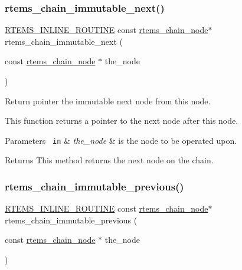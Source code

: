 \subsubsection{\texorpdfstring{rtems\_chain\_immutable\_next()}{rtems\_chain\_immutable\_next()}}
{\footnotesize\ttfamily \mbox{\hyperlink{group__RTEMSScoreBaseDefs_gac216239df231d5dbd15e3520b0b9313f}{R\+T\+E\+M\+S\+\_\+\+I\+N\+L\+I\+N\+E\+\_\+\+R\+O\+U\+T\+I\+NE}} const \mbox{\hyperlink{structChain__Node__struct}{rtems\+\_\+chain\+\_\+node}}$\ast$ rtems\+\_\+chain\+\_\+immutable\+\_\+next (\begin{DoxyParamCaption}\item[{const \mbox{\hyperlink{structChain__Node__struct}{rtems\+\_\+chain\+\_\+node}} $\ast$}]{the\+\_\+node }\end{DoxyParamCaption})}



Return pointer the immutable next node from this node. 

This function returns a pointer to the next node after this node.


\begin{DoxyParams}[1]{Parameters}
\mbox{\texttt{ in}}  & {\em the\+\_\+node} & is the node to be operated upon.\\
\hline
\end{DoxyParams}
\begin{DoxyReturn}{Returns}
This method returns the next node on the chain. 
\end{DoxyReturn}
\mbox{\label{group__ClassicChains_ga75c2d9901c833e2cf819065fd9a897cd}} 
\subsubsection{\texorpdfstring{rtems\_chain\_immutable\_previous()}{rtems\_chain\_immutable\_previous()}}
{\footnotesize\ttfamily \mbox{\hyperlink{group__RTEMSScoreBaseDefs_gac216239df231d5dbd15e3520b0b9313f}{R\+T\+E\+M\+S\+\_\+\+I\+N\+L\+I\+N\+E\+\_\+\+R\+O\+U\+T\+I\+NE}} const \mbox{\hyperlink{structChain__Node__struct}{rtems\+\_\+chain\+\_\+node}}$\ast$ rtems\+\_\+chain\+\_\+immutable\+\_\+previous (\begin{DoxyParamCaption}\item[{const \mbox{\hyperlink{structChain__Node__struct}{rtems\+\_\+chain\+\_\+node}} $\ast$}]{the\+\_\+node }\end{DoxyParamCaption})}



